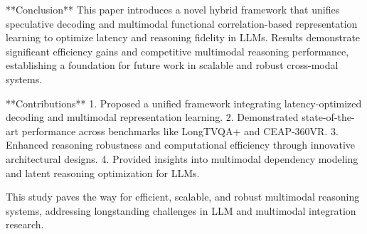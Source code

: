 **Conclusion**  
This paper introduces a novel hybrid framework that unifies speculative decoding and multimodal functional correlation-based representation learning to optimize latency and reasoning fidelity in LLMs. Results demonstrate significant efficiency gains and competitive multimodal reasoning performance, establishing a foundation for future work in scalable and robust cross-modal systems.

**Contributions**  
1. Proposed a unified framework integrating latency-optimized decoding and multimodal representation learning.  
2. Demonstrated state-of-the-art performance across benchmarks like LongTVQA+ and CEAP-360VR.  
3. Enhanced reasoning robustness and computational efficiency through innovative architectural designs.  
4. Provided insights into multimodal dependency modeling and latent reasoning optimization for LLMs.  

This study paves the way for efficient, scalable, and robust multimodal reasoning systems, addressing longstanding challenges in LLM and multimodal integration research.